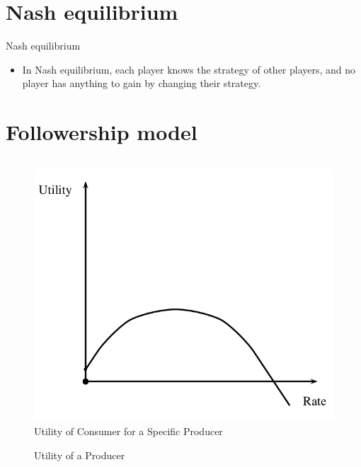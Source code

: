 \documentclass[aspectratio=169]{beamer}
\newcommand{\bi}{\begin{itemize}}
\newcommand{\ei}{\end{itemize}}
\begin{document}
\section{Nash equilibrium}
\begin{frame}{Nash equilibrium}
    \bi
\item In Nash equilibrium, each player knows the strategy of other players, and
    no player has anything to gain by changing their strategy.
    \ei
\end{frame}

\section{Followership model}
\begin{frame}
    \begin{columns}[T]
        \begin{column}{0.2\textwidth}
            \begin{figure}[!ht]
                \centering
                \caption{Utility of Consumer for a Specific Producer}
                \includegraphics[scale=0.1]{./figures/follow_user_utility.png}
            \end{figure}
            \begin{figure}[!ht]
                \caption{Utility of a Producer}

\end{figure}
\end{column}
\end{columns}
\end{frame}
\end{document}
